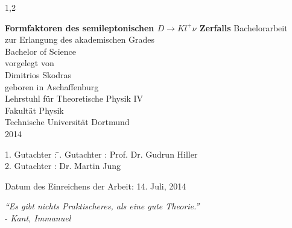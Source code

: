 \documentclass[11pt,a4paper,twoside,draft]{report}
\begin{document}
\begin{spacing}{1,2}

%
%


\newcommand{\thetitle}{Formfaktoren des semileptonischen $D \rightarrow  K l^+ \nu$ Zerfalls}

\thispagestyle{empty}
\begin{center}
\Huge\textbf{\thetitle}
\vfill
\vfill
\Large
Bachelorarbeit \\ zur Erlangung des akademischen Grades \\ Bachelor of Science \\
\vspace{20pt}
\normalsize
vorgelegt von \\[5pt]
{\Large Dimitrios Skodras} \\[5pt]
geboren in Aschaffenburg \\
\vspace{20pt}
Lehrstuhl für Theoretische Physik IV \\ Fakultät Physik \\
Technische Universität Dortmund \\ 2014
\end{center}
\newpage


\thispagestyle{empty}
\vspace*{\fill}
\begin{tabbing}
1. Gutachter : \=. Gutachter : \>Prof. Dr. Gudrun Hiller \\[11pt]
2. Gutachter : \>Dr. Martin Jung\\[11pt]
\end{tabbing}
\vspace{11pt}
Datum des Einreichens der Arbeit: 14. Juli, 2014
\newpage
\thispagestyle{empty}
\begin{flushright} 
\textit{``Es gibt nichts Praktischeres, als eine gute Theorie.''}\\
- \textit{Kant, Immanuel}\\
\vspace{2cm}
\end{flushright}


\end{spacing}
\end{document}
